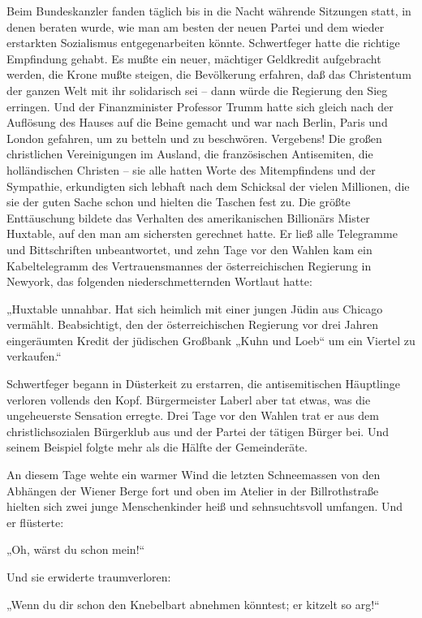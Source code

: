 Beim Bundeskanzler fanden täglich bis in die Nacht währende
Sitzungen statt, in denen beraten wurde, wie man am besten der
neuen Partei und dem wieder erstarkten Sozialismus entgegenarbeiten
könnte. Schwertfeger hatte die richtige Empfindung gehabt. Es mußte
ein neuer, mächtiger Geldkredit aufgebracht werden, die Krone mußte
steigen, die Bevölkerung erfahren, daß das Christentum der ganzen
Welt mit ihr solidarisch sei – dann würde die Regierung den Sieg
erringen. Und der Finanzminister Professor Trumm hatte sich gleich
nach der Auflösung des Hauses auf die Beine gemacht und war nach
Berlin, Paris und London gefahren, um zu betteln und zu beschwören.
Vergebens! Die großen christlichen Vereinigungen im Ausland, die
französischen Antisemiten, die holländischen Christen
 – sie alle hatten Worte des Mitempfindens und der
Sympathie, erkundigten sich lebhaft nach dem Schicksal der vielen
Millionen, die sie der guten Sache schon
 und hielten die Taschen fest zu. Die
größte Enttäuschung bildete das Verhalten des amerikanischen
Billionärs Mister Huxtable, auf den man am sichersten gerechnet
hatte. Er ließ alle Telegramme und Bittschriften unbeantwortet, und
zehn Tage vor den Wahlen kam ein Kabeltelegramm des
Vertrauensmannes der österreichischen Regierung in Newyork, das
folgenden niederschmetternden Wortlaut hatte:

„Huxtable unnahbar. Hat sich heimlich mit einer jungen Jüdin aus
Chicago vermählt. Beabsichtigt, den der österreichischen Regierung
vor drei Jahren eingeräumten Kredit der jüdischen Großbank „Kuhn
und Loeb“ um ein Viertel zu verkaufen.“

Schwertfeger begann in Düsterkeit zu erstarren, die antisemitischen
Häuptlinge verloren vollends den Kopf. Bürgermeister Laberl aber
tat etwas, was die ungeheuerste Sensation erregte. Drei Tage vor
den Wahlen trat er aus dem christlichsozialen Bürgerklub aus und
der Partei der tätigen Bürger bei. Und seinem Beispiel folgte mehr
als die Hälfte der Gemeinderäte.

An diesem Tage wehte ein warmer Wind die letzten Schneemassen von
den Abhängen der Wiener Berge fort und oben im Atelier in der
Billrothstraße hielten sich zwei junge Menschenkinder heiß und
sehnsuchtsvoll umfangen. Und er flüsterte:

„Oh, wärst du schon mein!“

Und sie erwiderte traumverloren:

„Wenn du dir schon den Knebelbart abnehmen
könntest; er kitzelt so arg!“

